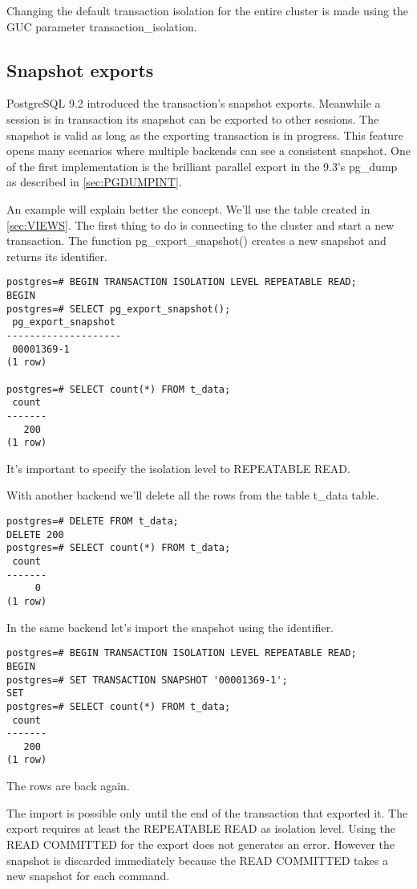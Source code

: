 Changing the default transaction isolation for the entire cluster is made using the GUC parameter
transaction\_isolation.


\subsection{Snapshot exports}
\label{sub:SNAPEXPORT}
PostgreSQL 9.2 introduced the transaction's snapshot exports. Meanwhile a session is in
transaction its snapshot can be exported to other sessions. The snapshot is valid as long as the
exporting transaction is in progress. This feature opens many scenarios where multiple backends
can see a consistent snapshot. One of the first implementation is the brilliant parallel export in 
the 9.3's pg\_dump as described in \ref{sec:PGDUMPINT}.\newline

An example will explain better the concept. We'll use the table created in \ref{sec:VIEWS}.
The first thing to do is connecting to the cluster and start a new transaction. The function
pg\_export\_snapshot() creates a new snapshot and returns its identifier.

\begin{lstlisting}[style=pgsql]
postgres=# BEGIN TRANSACTION ISOLATION LEVEL REPEATABLE READ;
BEGIN
postgres=# SELECT pg_export_snapshot();
 pg_export_snapshot 
--------------------
 00001369-1
(1 row)

postgres=# SELECT count(*) FROM t_data;
 count 
-------
   200
(1 row)

\end{lstlisting}

It's important to specify the isolation level to REPEATABLE READ. 


With another backend we'll delete all the rows from the table t\_data table.

\begin{lstlisting}[style=pgsql]
postgres=# DELETE FROM t_data;
DELETE 200
postgres=# SELECT count(*) FROM t_data;
 count 
-------
     0
(1 row)

\end{lstlisting}

In the same backend let's import the snapshot using the identifier.

\begin{lstlisting}[style=pgsql]
postgres=# BEGIN TRANSACTION ISOLATION LEVEL REPEATABLE READ;
BEGIN
postgres=# SET TRANSACTION SNAPSHOT '00001369-1';
SET
postgres=# SELECT count(*) FROM t_data;
 count 
-------
   200
(1 row)

\end{lstlisting}

The rows are back again.

The import is possible only until the end of the 
transaction that exported it. The export requires at least the REPEATABLE READ as isolation level.
Using the READ COMMITTED for the export does not generates an error. However the snapshot is
discarded immediately because the READ COMMITTED takes a new snapshot for each command.

